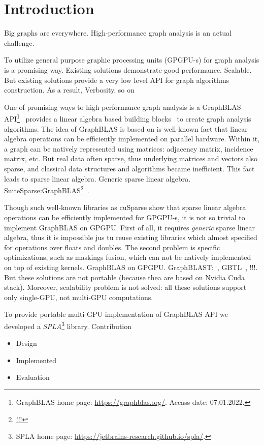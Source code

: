 \section{Introduction}

Big graphs are everywhere.
High-performance graph analysis is an actual challenge. \cite{Coimbra2021}

To utilize general purpose graphic processing units (GPGPU-s) for graph analysis is a promising way.
Existing solutions demonstrate good performance.
Scalable. 
But existing solutions provide a very low level API for graph algorithms construction.
As a result, Verbosity, so on

One of promising ways to high performance graph analysis is a GraphBLAS API\footnote{GraphBLAS home page: \url{https://graphblas.org/}. Accass date: 07.01.2022.}~\cite{!!!} provides a linear algebra based building blocks~\cite{7761646} to create graph analysis algorithms.
The idea of GraphBLAS is based on is well-known fact that linear algebra operations can be efficiently implemented on parallel hardware.
Within it, a graph can be natively represented using matrices: adjacency matrix, incidence matrix, etc.
But real data often sparse, thus underlying matrices and vectors also sparse, and classical data structures and algorithms became inefficient. 
This fact leads to sparse linear algebra.
Generic sparse linear algebra.
SuiteSparse:GraphBLAS\footnote{\url{!!!}}~\cite{!!!}.

Though such well-known libraries as cuSparse show that sparse linear algebra operations can be efficiently implemented for GPGPU-s, it is not so trivial to implement GraphBLAS on GPGPU. 
First of all, it requires \textit{generic} sparse linear algebra, thus it is impossible jus tu reuse existing libraries which almost specified for operations over floats and doubles.
The second problem is specific optimizations, such as maskings fusion, which can not be natively implemented on top of existing kernels.
GraphBLAS on GPGPU.
GraphBLAST:~\cite{yang2019graphblast}, GBTL~\cite{!!!}, !!!.
But these solutions are not portable (because thea are based on Nvidia Cuda stack).
Moreover, scalability problem is not solved: all these solutions support only single-GPU, not multi-GPU computations.

To provide portable multi-GPU implementation of GraphBLAS API we developed a \textit{SPLA}\footnote{SPLA home page: \url{https://jetbrains-research.github.io/spla/}.} library.
Contribution
\begin{itemize}
    \item Design
    \item Implemented
    \item Evaluation
\end{itemize} 